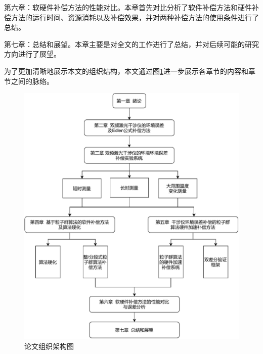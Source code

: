 第六章：软硬件补偿方法的性能对比。本章首先对比分析了软件补偿方法和硬件补偿方法的运行时间、资源消耗以及补偿效果，并对两种补偿方法的使用条件进行了总结。

第七章：总结和展望。本章主要是对全文的工作进行了总结，并对后续可能的研究方向进行了展望。

为了更加清晰地展示本文的组织结构，本文通过图\ref{fig:论文组织架构图}进一步展示各章节的内容和章节之间的脉络。

\clearpage
\begin{figure}[H]
    \centering
    \includegraphics[width=13cm]{fig/1-fig/论文组织架构图.drawio.pdf}
    \caption{论文组织架构图}
    \label{fig:论文组织架构图}
\end{figure}